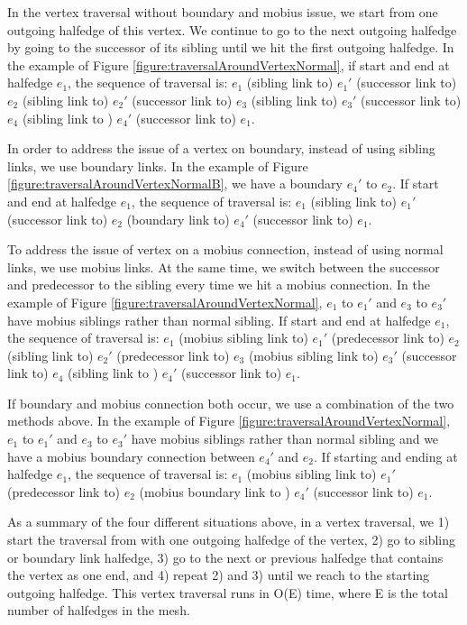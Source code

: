 \documentclass[12pt]{article}
\begin{document}
In the vertex traversal without boundary and mobius issue, we start from one outgoing halfedge of this vertex. We continue to go to the next outgoing halfedge by going to the successor of its sibling until we hit the first outgoing halfedge. In the example of Figure \ref{figure:traversalAroundVertexNormal}, if start and end at halfedge $e_1$, the sequence of traversal is: $e_1$ (sibling link to) $e_1'$ (successor link to) $e_2$ (sibling link to) $e_2'$ (successor link to) $e_3$ (sibling link to) $e_3'$ (successor link to) $e_4$ (sibling link to ) $e_4'$  (successor link to)  $e_1$.

In order to address the issue of a vertex on boundary, instead of using sibling links, we use boundary links. In the example of Figure \ref{figure:traversalAroundVertexNormalB}, we have a boundary $e_4'$ to $e_2$. If start and end at halfedge $e_1$, the sequence of traversal is: $e_1$ (sibling link to) $e_1'$ (successor link to) $e_2$ (boundary link to) $e_4'$ (successor link to)  $e_1$.

To address the issue of vertex on a mobius connection, instead of using normal links, we use mobius links. At the same time, we switch between the successor and predecessor to the sibling every time we hit a mobius connection.  In the example of Figure \ref{figure:traversalAroundVertexNormal}, $e_1$ to $e_1'$ and $e_3$ to $e_3'$ have mobius siblings rather than normal sibling. If start and end at halfedge $e_1$, the sequence of traversal is: $e_1$ (mobius sibling link to) $e_1'$ (predecessor link to) $e_2$ (sibling link to) $e_2'$ (predecessor link to) $e_3$ (mobius sibling link to) $e_3'$ (successor link to) $e_4$ (sibling link to ) $e_4'$  (successor link to)  $e_1$.

If boundary and mobius connection both occur, we use a combination of the two methods above. In the example of Figure \ref{figure:traversalAroundVertexNormal}, $e_1$ to $e_1'$ and $e_3$ to $e_3'$ have mobius siblings rather than normal sibling and we have a mobius boundary connection between $e_4'$ and $e_2$. If starting and ending at halfedge $e_1$, the sequence of traversal is: $e_1$ (mobius sibling link to) $e_1'$ (predecessor link to) $e_2$ (mobius boundary link to ) $e_4'$  (successor link to)  $e_1$.

As a summary of the four different situations above, in a vertex traversal, we 1) start the traversal from with one outgoing halfedge of the vertex, 2) go to sibling or boundary link halfedge, 3) go to the next or previous halfedge that contains the vertex as one end, and 4) repeat 2) and 3) until we reach to the starting outgoing halfedge. This vertex traversal runs in O(E) time, where E is the total number of halfedges in the mesh.
\end{document}
